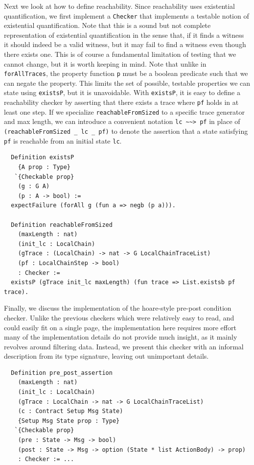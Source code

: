 \documentclass[twoside,11pt,openright]{report}
\newenvironment{code}{\captionsetup{type=figure, singlelinecheck=off, justification=raggedleft}}{}
\newcommand{\coq}[1]{\texttt{#1}}
\begin{document}
Next we look at how to define reachability. Since reachability uses existential quantification, we first implement a \coq{Checker} that implements a testable notion of existential quantification. Note that this is a sound but not complete representation of existential quantification in the sense that, if it finds a witness it should indeed be a valid witness, but it may fail to find a witness even though there exists one. This is of course a fundamental limitation of testing that we cannot change, but it is worth keeping in mind. Note that unlike in \coq{forAllTraces}, the property function \coq{p} must be a boolean predicate such that we can negate the property. This limits the set of possible, testable properties we can state using \coq{existsP}, but it is unavoidable. With \coq{existsP}, it is easy to define a reachability checker by asserting that there exists a trace where \coq{pf} holds in at least one step. If we specialize \coq{reachableFromSized} to a specific trace generator and max length, we can introduce a convenient notation \coq{lc \textasciitilde\textasciitilde> pf} in place of \coq{(reachableFromSized \_ lc \_ pf)} to denote the assertion that a state satisfying \coq{pf} is reachable from an initial state \coq{lc}.
\begin{code}
\label{def:existsP-reachableFromSized}
\begin{verbatim}
  Definition existsP
    {A prop : Type} 
   `{Checkable prop} 
    (g : G A) 
    (p : A -> bool) := 
  expectFailure (forAll g (fun a => negb (p a))).
    
  Definition reachableFromSized
    (maxLength : nat) 
    (init_lc : LocalChain)
    (gTrace : (LocalChain) -> nat -> G LocalChainTraceList)
    (pf : LocalChainStep -> bool)
    : Checker := 
  existsP (gTrace init_lc maxLength) (fun trace => List.existsb pf trace).
\end{verbatim}
\end{code}
Finally, we discuss the implementation of the hoare-style pre-post condition checker. Unlike the previous checkers which were relatively easy to read, and could easily fit on a single page, the implementation here requires more effort many of the implementation details do not provide much insight, as it mainly revolves around filtering data. Instead, we present this checker with an informal description from its type signature, leaving out unimportant details. 
\begin{code}
\label{def:pre_post_assertion}
\begin{verbatim}
  Definition pre_post_assertion
    (maxLength : nat)
    (init_lc : LocalChain)
    (gTrace : LocalChain -> nat -> G LocalChainTraceList)
    (c : Contract Setup Msg State)
    {Setup Msg State prop : Type} 
   `{Checkable prop}
    (pre : State -> Msg -> bool)
    (post : State -> Msg -> option (State * list ActionBody) -> prop) 
    : Checker := ...
\end{verbatim}
\end{code}
\end{document}
